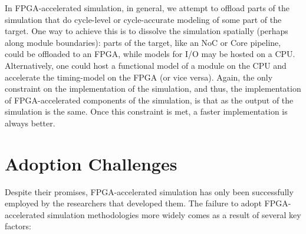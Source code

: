 
In FPGA-accelerated simulation, in general, we attempt to offload parts of the
simulation that do cycle-level or cycle-accurate modeling of some part of the
target. One way to achieve this is to dissolve the simulation spatially
(perhaps along module boundaries): parts of the target, like an NoC or Core
pipeline, could be offloaded to an FPGA, while models for I/O may be hosted on
a CPU.  Alternatively, one could host a functional model of a module on the CPU
and accelerate the timing-model on the FPGA (or vice versa).  Again, the only
constraint on the implementation of the simulation, and thus, the
implementation of FPGA-accelerated components of the simulation, is that as the
output of the simulation is the same. Once this constraint is met, a faster
implementation is always better.

\section{Adoption Challenges}

Despite their promises, FPGA-accelerated simulation has only been successfully
employed by the researchers that developed them. The failure to adopt
FPGA-accelerated simulation methodologies more widely comes as a result of
several key factors:

